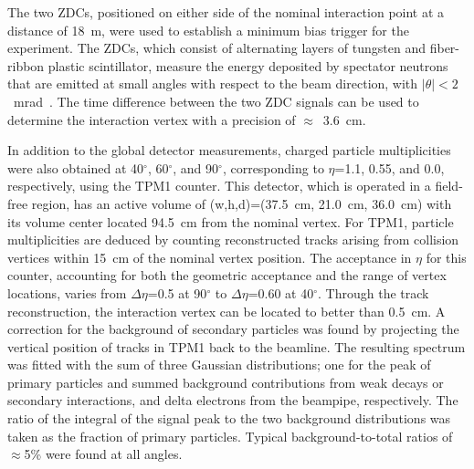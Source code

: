\documentclass[singlespacing]{elsart}
\begin{document}
The two ZDCs, positioned on either side of the nominal interaction 
point at a distance of 18~m, were used to establish a minimum bias trigger 
for the experiment.  The ZDCs,
which consist of alternating 
layers of tungsten and fiber-ribbon plastic scintillator,  
measure the energy 
deposited by spectator neutrons that are emitted at small angles
with respect to the beam direction, with $|\theta|< 2$~mrad~\cite{adler00}. 
The time difference between the 
two ZDC signals can be used to determine the interaction vertex 
with a precision of $\approx$~3.6~cm.

In addition to the global detector measurements,
charged particle multiplicities were also obtained at 
40$^\circ$, 60$^\circ$, and
90$^\circ$, corresponding to $\eta$=1.1, 0.55, and 0.0, respectively,
using the TPM1 counter.  
This detector, which is operated in a field-free region, 
has an active volume of (w,h,d)=(37.5~cm, 21.0~cm, 36.0~cm)
with its volume center located 94.5~cm from the  nominal vertex. 
For TPM1, particle multiplicities are deduced by 
counting reconstructed tracks arising from collision
vertices within 15~cm of the nominal vertex position. 
The
acceptance in $\eta$ for this counter, accounting for both the geometric
acceptance and the range of vertex locations,  
varies from $\Delta\eta$=0.5 at 
90$^\circ$ to $\Delta\eta$=0.60 at 40$^\circ$. 
Through the track reconstruction,
the interaction vertex can be located to better than 0.5~cm.   
A correction for the background of secondary particles was found by
projecting the vertical position of tracks in TPM1 back to the beamline.
The resulting spectrum was fitted with the sum of three Gaussian 
distributions; one for
the peak of primary particles and summed background contributions from weak
decays or secondary interactions, and delta electrons from the beampipe,
respectively. The ratio of the integral of the signal peak to the two
background distributions was taken as the fraction of primary particles. 
Typical background-to-total ratios of $\approx$5\% were found at all
angles.
\end{document}
